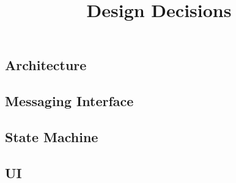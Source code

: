 \documentclass[a4paper, 11pt]{article}
\title{Design Decisions}
\begin{document}
	\maketitle
	\subsection*{Architecture}
	\subsection*{Messaging Interface}
	\subsection*{State Machine}
	\subsection*{UI}
	
\end{document}
